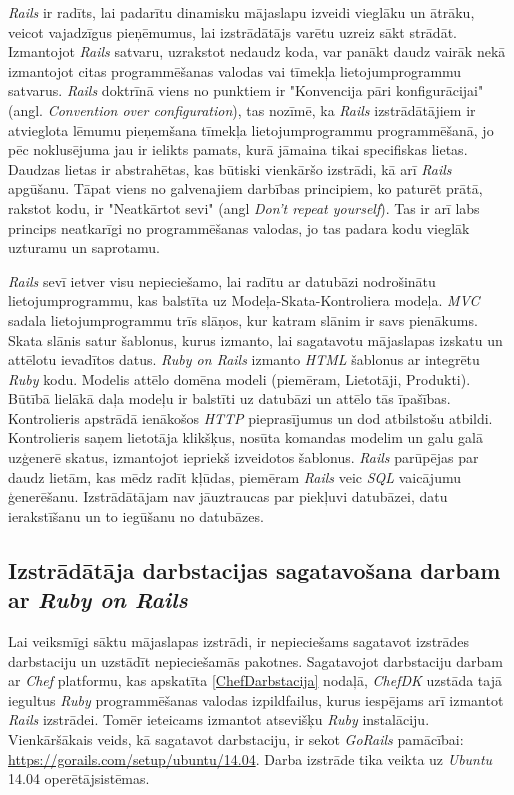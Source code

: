 \textit{Rails} ir radīts, lai padarītu dinamisku mājaslapu izveidi vieglāku un ātrāku, veicot vajadzīgus pieņēmumus, lai izstrādātājs varētu uzreiz sākt strādāt. Izmantojot \textit{Rails} satvaru, uzrakstot nedaudz koda, var panākt daudz vairāk nekā izmantojot citas programmēšanas valodas vai tīmekļa lietojumprogrammu satvarus. \textit{Rails} doktrīnā viens no punktiem ir "Konvencija pāri konfigurācijai" (angl. \textit{Convention over configuration}), tas nozīmē, ka \textit{Rails} izstrādātājiem ir atvieglota lēmumu pieņemšana tīmekļa lietojumprogrammu programmēšanā, jo pēc noklusējuma jau ir ielikts pamats, kurā jāmaina tikai specifiskas lietas. Daudzas lietas ir abstrahētas, kas būtiski vienkāršo izstrādi, kā arī \textit{Rails} apgūšanu. Tāpat viens no galvenajiem darbības principiem, ko paturēt prātā, rakstot kodu, ir "Neatkārtot sevi" (angl \textit{Don't repeat yourself}). Tas ir arī labs princips neatkarīgi no programmēšanas valodas, jo tas padara kodu vieglāk uzturamu un saprotamu.
\cite[1.1 nodaļa]{hartlRails} \cite[getting_started]{rails-guides}

\textit{Rails} sevī ietver visu nepieciešamo, lai radītu ar datubāzi nodrošinātu lietojumprogrammu, kas balstīta uz Modeļa-Skata-Kontroliera  modeļa.
\textit{MVC} sadala lietojumprogrammu trīs slāņos, kur katram slānim ir savs pienākums.
Skata slānis satur šablonus, kurus izmanto, lai sagatavotu mājaslapas izskatu un attēlotu ievadītos datus. \textit{Ruby on Rails} izmanto \textit{HTML} šablonus ar integrētu \textit{Ruby} kodu.
Modelis attēlo domēna modeli (piemēram, Lietotāji, Produkti). Būtībā lielākā daļa modeļu ir balstīti uz datubāzi un attēlo tās īpašības.
Kontrolieris apstrādā ienākošos \textit{HTTP} pieprasījumus un dod atbilstošu atbildi. Kontrolieris saņem lietotāja klikšķus, nosūta komandas modelim un galu galā uzģenerē skatus, izmantojot iepriekš izveidotos šablonus.
\cite{rails-api}
\textit{Rails} parūpējas par daudz lietām, kas mēdz radīt kļūdas, piemēram \textit{Rails} veic \textit{SQL} vaicājumu ģenerēšanu. Izstrādātājam nav jāuztraucas par piekļuvi datubāzei, datu ierakstīšanu un to iegūšanu no datubāzes.

\subsection{Izstrādātāja darbstacijas sagatavošana darbam ar \textit{Ruby on Rails}} \label{RubyDarbstacija}
Lai veiksmīgi sāktu mājaslapas izstrādi, ir nepieciešams sagatavot izstrādes darbstaciju un uzstādīt nepieciešamās pakotnes. Sagatavojot darbstaciju darbam ar \textit{Chef} platformu, kas apskatīta \ref{ChefDarbstacija} nodaļā, \textit{ChefDK} uzstāda tajā iegultus \textit{Ruby} programmēšanas valodas izpildfailus, kurus iespējams arī izmantot \textit{Rails} izstrādei. Tomēr ieteicams izmantot atsevišķu \textit{Ruby} instalāciju. Vienkāršākais veids, kā sagatavot darbstaciju, ir sekot \textit{GoRails} pamācībai: \url{https://gorails.com/setup/ubuntu/14.04}. Darba izstrāde tika veikta uz \textit{Ubuntu} 14.04 operētājsistēmas.


